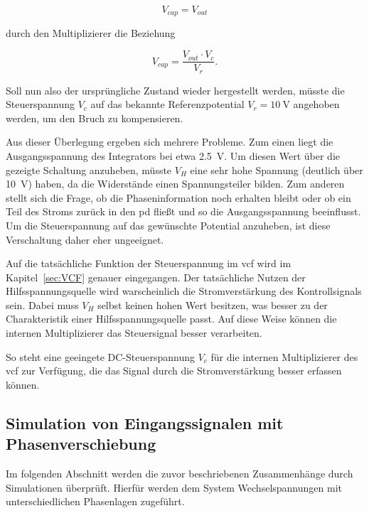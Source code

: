 \documentclass[../main.tex]{subfiles}
\begin{document}
\begin{equation*}
    V_{cap} = V_{out}
\end{equation*}
  
durch den Multiplizierer die Beziehung
  
\begin{equation*}
    V_{cap} = \frac{V_{out} \cdot V_{c}}{V_r}.
\end{equation*}

Soll nun also der ursprüngliche Zustand wieder hergestellt werden, müsste die Steuerspannung $V_c$ auf das bekannte Referenzpotential $V_r=\SI{10}{\volt}$ angehoben werden, um den Bruch zu kompensieren.\par
\medskip
Aus dieser Überlegung ergeben sich mehrere Probleme. Zum einen liegt die Ausgangsspannung des Integrators bei etwa \SI{2.5}{\volt}. Um diesen Wert über die gezeigte Schaltung anzuheben, müsste $V_H$ eine sehr hohe Spannung (deutlich über \SI{10}{\volt}) haben, da die Widerstände einen Spannungsteiler bilden. Zum anderen stellt sich die Frage, ob die Phaseninformation noch erhalten bleibt oder ob ein Teil des Stroms zurück in den \gls{pd} fließt und so die Ausgangsspannung beeinflusst. Um die Steuerspannung auf das gewünschte Potential anzuheben, ist diese Verschaltung daher eher ungeeignet.\par
\medskip
Auf die tatsächliche Funktion der Steuerspannung im \gls{vcf} wird im Kapitel~\ref{sec:VCF} genauer eingegangen. Der tatsächliche Nutzen der Hilfsspannungsquelle wird warscheinlich die Stromverstärkung des Kontrollsignals sein. Dabei muss $V_H$  selbst keinen hohen Wert besitzen, was besser zu der Charakteristik einer Hilfsspannungsquelle passt. Auf diese Weise können die internen Multiplizierer das Steuersignal besser verarbeiten.\par
\medskip
So steht eine geeingete DC-Steuerspannung $V_c$ für die internen Multiplizierer des \gls{vcf} zur Verfügung, die das Signal durch die Stromverstärkung besser erfassen können.\par
\medskip



\subsection{Simulation von Eingangssignalen mit Phasenverschiebung}
\label{sec:anpassungsrate}
Im folgenden Abschnitt werden die zuvor beschriebenen Zusammenhänge durch Simulationen überprüft. Hierfür werden dem System Wechselspannungen mit unterschiedlichen Phasenlagen zugeführt.\par
\medskip
\end{document}
